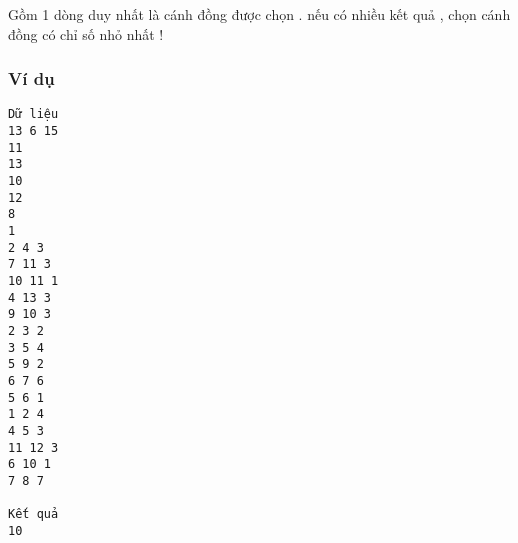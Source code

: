    Gồm 1 dòng duy nhất là cánh đồng được chọn . nếu có nhiều kết quả , chọn cánh đồng có chỉ số nhỏ nhất !  

\subsubsection{   Ví dụ  }
\begin{verbatim}
Dữ liệu
13 6 15
11
13
10
12
8
1
2 4 3
7 11 3
10 11 1
4 13 3
9 10 3
2 3 2
3 5 4
5 9 2
6 7 6
5 6 1
1 2 4
4 5 3
11 12 3
6 10 1
7 8 7

Kết quả
10
\end{verbatim}